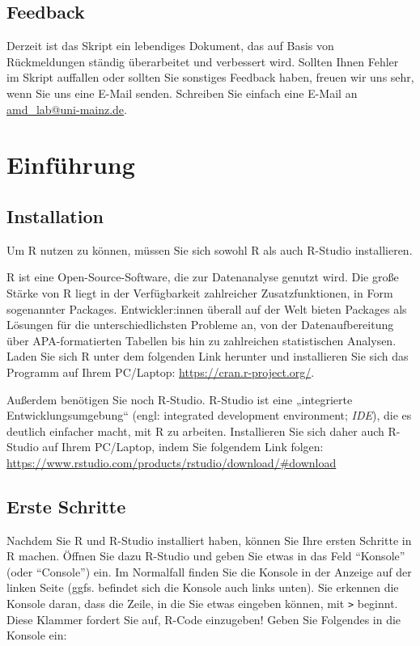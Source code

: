 \documentclass[
  ngerman,
]{book}
\begin{document}
\section{Feedback}\label{feedback}

Derzeit ist das Skript ein lebendiges Dokument, das auf Basis von Rückmeldungen ständig überarbeitet und verbessert wird. Sollten Ihnen Fehler im Skript auffallen oder sollten Sie sonstiges Feedback haben, freuen wir uns sehr, wenn Sie uns eine E-Mail senden. Schreiben Sie einfach eine E-Mail an \href{mailto:amd_lab@uni-mainz.de?subject=R-Kurs-Unterlagen}{amd\_lab@uni-mainz.de}.

\chapter{Einführung}\label{einfuxfchrung}

\section{Installation}\label{installation}

Um R nutzen zu können, müssen Sie sich sowohl R als auch R-Studio installieren.

R ist eine Open-Source-Software, die zur Datenanalyse genutzt wird. Die große Stärke von R liegt in der Verfügbarkeit zahlreicher Zusatzfunktionen, in Form sogenannter Packages. Entwickler:innen überall auf der Welt bieten Packages als Lösungen für die unterschiedlichsten Probleme an, von der Datenaufbereitung über APA-formatierten Tabellen bis hin zu zahlreichen statistischen Analysen. Laden Sie sich R unter dem folgenden Link herunter und installieren Sie sich das Programm auf Ihrem PC/Laptop: \url{https://cran.r-project.org/}.

Außerdem benötigen Sie noch R-Studio. R-Studio ist eine „integrierte Entwicklungsumgebung`` (engl: integrated development environment; \emph{IDE}), die es deutlich einfacher macht, mit R zu arbeiten. Installieren Sie sich daher auch R-Studio auf Ihrem PC/Laptop, indem Sie folgendem Link folgen: \url{https://www.rstudio.com/products/rstudio/download/\#download}

\section{Erste Schritte}\label{erste-schritte}

Nachdem Sie R und R-Studio installiert haben, können Sie Ihre ersten Schritte in R machen. Öffnen Sie dazu R-Studio und geben Sie etwas in das Feld ``Konsole'' (oder ``Console'') ein. Im Normalfall finden Sie die Konsole in der Anzeige auf der linken Seite (ggfs. befindet sich die Konsole auch links unten). Sie erkennen die Konsole daran, dass die Zeile, in die Sie etwas eingeben können, mit \texttt{\textgreater{}} beginnt. Diese Klammer fordert Sie auf, R-Code einzugeben! Geben Sie Folgendes in die Konsole ein:
\end{document}

